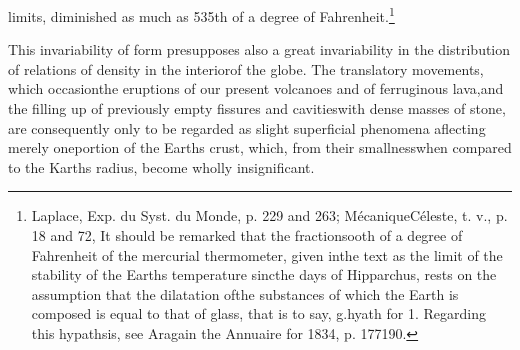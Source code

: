 limits, diminished as much as 535th of a degree of Fahrenheit.\footnote{Laplace, Exp. du Syst. du Monde, p. 229 and 263; M\'{e}caniqueC\'{e}leste, t. v., p. 18 and 72, It should be remarked that the fractionsooth of a degree of Fahrenheit of the mercurial thermometer, given inthe text as the limit of the stability of the Earths temperature sincthe days of Hipparchus, rests on the assumption that the dilatation ofthe substances of which the Earth is composed is equal to that of glass, that is to say, g.hyath for 1. Regarding this hypathsis, see Aragain the Annuaire for 1834, p. 177190.}

This invariability of form presupposes also a great invariability in the distribution of relations of density in the interiorof the globe. The translatory movements, which occasionthe eruptions of our present volcanoes and of ferruginous lava,and the filling up of previously empty fissures and cavitieswith dense masses of stone, are consequently only to be regarded as slight superficial phenomena aflecting merely oneportion of the Earths crust, which, from their smallnesswhen compared to the Karths radius, become wholly insignificant.
